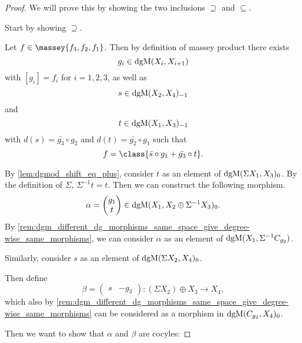 \begin{proof}
    We will prove this by showing the two inclusions \( \supseteq \) and \( \subseteq \).

    Start by showing \( \supseteq \).

    Let \( f \in \massey{f_3, f_2, f_1} \). Then by definition of massey product there exists
    \[
        g_i \in \operatorname{dgM}(X_i, X_{i + 1})
    \]
    with \( [g_i] = f_i \) for \( i = 1, 2, 3 \), as well as
    \[
        s \in \operatorname{dgM}(X_2, X_4)_{-1}
    \]
    and
    \[
        t \in \operatorname{dgM}(X_1, X_3)_{-1}
    \]
    with \( d(s) = \bar{g_3} \circ g_2 \) and \( d(t) = \bar{g_2} \circ g_1 \) such that
    \[
        f = \class{\bar{s} \circ g_1 + \bar{g_3} \circ t}.
    \]

    By \autoref{lem:dgmod_shift_eq_plus}, consider \( t \) as an element of \( \operatorname{dgM}(\Sigma X_1, X_3)_0 \). By the definition of \( \Sigma \), \( \Sigma^{-1} t = t \). Then we can construct the following morphism.
    \[
        \alpha =
        \begin{pmatrix}
            g_1 \\
            t
        \end{pmatrix}
        \in \operatorname{dgM}(X_1, X_2 \oplus \Sigma^{-1} X_3)_0.
    \]
    By \autoref{rem:dgm_different_dg_morphisms_same_space_give_degree-wise_same_morphisms}, we can consider \( \alpha \) as an element of \( \operatorname{dgM}(X_1, \Sigma^{-1} C_{g_2}) \).

    Similarly, consider \( s \) as an element of \( \operatorname{dgM}(\Sigma X_2, X_4)_0 \).

    Then define
    \[
        \beta =
        \begin{pmatrix}
            s & -g_3
        \end{pmatrix}
        : (\Sigma X_2) \oplus X_3 \to X_4,
    \]
    which also by \autoref{rem:dgm_different_dg_morphisms_same_space_give_degree-wise_same_morphisms} can be considered as a morphism in \( \operatorname{dgM}(C_{g_2}, X_4)_0 \).

    Then we want to show that \( \alpha \) and \( \beta \) are cocyles:


\end{proof}
